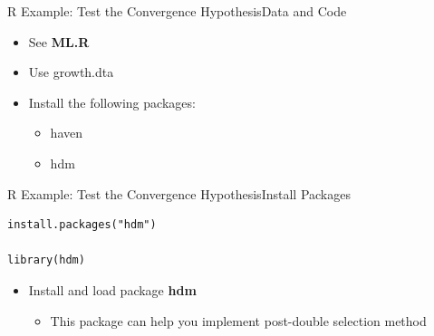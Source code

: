 \documentclass[hyperref={pdfpagelabels=false}]{beamer}
\begin{document}
\author 
{}

\institute{}






\date
{}


\begin{frame}{}
	\titlepage
\end{frame}






\begin{frame}[fragile]{R Example: Test the Convergence Hypothesis}{Data and Code}
	\begin{itemize}
		\item See \textbf{ML.R}
		\vspace{0.2cm}
		\item Use growth.dta
		\vspace{0.2cm}
		\item Install the following packages:
		\begin{itemize}
			\vspace{0.2cm}
			\item haven
			\item hdm
		\end{itemize}
		
	\end{itemize}
\end{frame}



\begin{frame}[fragile]{R Example: Test the Convergence Hypothesis}{Install Packages}
		
\begin{lstlisting}
install.packages("hdm") 

library(hdm)
\end{lstlisting}
		
	\begin{itemize}
		\item Install and load package \textbf{hdm}
		\vspace{0.2cm}
		\begin{itemize}
			\item This package can help you implement post-double selection method
			
		\end{itemize}
	\end{itemize}
\end{frame}
\end{document}
